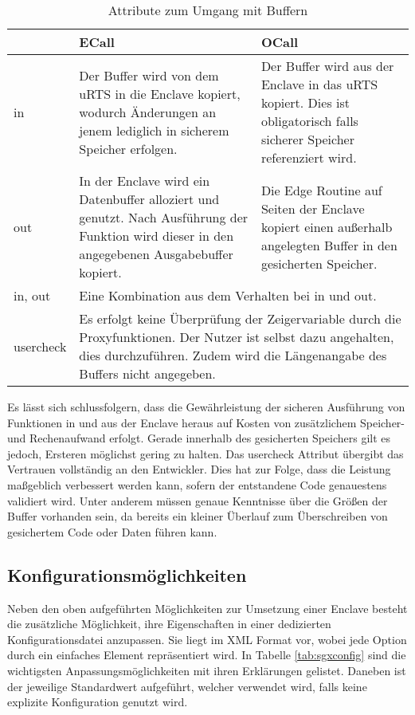 \begin{table}[h]
	\centering
	\caption{Attribute zum Umgang mit Buffern}
	\begin{tabularx}{\textwidth}{|l|X|X|}
		\hline
		& \textbf{\ac{ECall}} & \textbf{\ac{OCall}} \\
		\hline
		in & Der Buffer wird von dem \ac{uRTS} in die Enclave kopiert, wodurch Änderungen an jenem lediglich in sicherem Speicher erfolgen. & Der Buffer wird aus der Enclave in das \ac{uRTS} kopiert. Dies ist obligatorisch falls sicherer Speicher referenziert wird. \\
		\hline
		out & In der Enclave wird ein Datenbuffer alloziert und genutzt. Nach Ausführung der Funktion wird dieser in den angegebenen Ausgabebuffer kopiert. & Die Edge Routine auf Seiten der Enclave kopiert einen außerhalb angelegten Buffer in den gesicherten Speicher. \\
		\hline
		in, out & \multicolumn{2}{l|}{Eine Kombination aus dem Verhalten bei in und out.} \\
		\hline
		user\textunderscore check & \multicolumn{2}{p{0.8\textwidth}|}{Es erfolgt keine Überprüfung der Zeigervariable durch die Proxyfunktionen. Der Nutzer ist selbst dazu angehalten, dies durchzuführen. Zudem wird die Längenangabe des Buffers nicht angegeben.} \\
		\hline
	\end{tabularx}
	\label{tab:sgxbuffer}
\end{table}

Es lässt sich schlussfolgern, dass die Gewährleistung der sicheren Ausführung von Funktionen in und aus der Enclave heraus auf Kosten von zusätzlichem Speicher- und Rechenaufwand erfolgt. Gerade innerhalb des gesicherten Speichers gilt es jedoch, Ersteren möglichst gering zu halten. Das user\textunderscore check Attribut übergibt das Vertrauen vollständig an den Entwickler. Dies hat zur Folge, dass die Leistung maßgeblich verbessert werden kann, sofern der entstandene Code genauestens validiert wird. Unter anderem müssen genaue Kenntnisse über die Größen der Buffer vorhanden sein, da bereits ein kleiner Überlauf zum Überschreiben von gesichertem Code oder Daten führen kann.

\subsection{Konfigurationsmöglichkeiten}

Neben den oben aufgeführten Möglichkeiten zur Umsetzung einer Enclave besteht die zusätzliche Möglichkeit, ihre Eigenschaften in einer dedizierten Konfigurationsdatei anzupassen. Sie liegt im \acs{XML} Format vor, wobei jede Option durch ein einfaches Element repräsentiert wird. In Tabelle \ref{tab:sgxconfig} sind die wichtigsten Anpassungsmöglichkeiten mit ihren Erklärungen gelistet. Daneben ist der jeweilige Standardwert aufgeführt, welcher verwendet wird, falls keine explizite Konfiguration genutzt wird.

